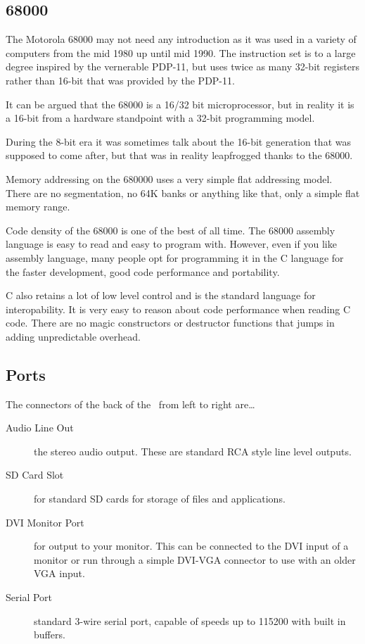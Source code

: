 \begin{leftbar}
\subsection*{68000}

The Motorola 68000 may not need any introduction as it was used in a
variety of computers from the mid 1980 up until mid 1990. The
instruction set is to a large degree inspired by the vernerable
PDP-11, but uses twice as many 32-bit registers rather than 16-bit that
was provided by the PDP-11.

It can be argued that the 68000 is a 16/32 bit microprocessor, but in
reality it is a 16-bit from a hardware standpoint with a 32-bit
programming model.

During the 8-bit era it was sometimes talk about the 16-bit generation that
was supposed to come after, but that was in reality leapfrogged thanks
to the 68000.

Memory addressing on the 680000 uses a very simple flat addressing
model. There are no segmentation, no 64K banks or anything like that,
only a simple flat memory range.

Code density of the 68000 is one of the best of all time. The 68000
assembly language is easy to read and easy to program with.
However, even if you like assembly language, many people opt for
programming it in the C language for the faster development, good code
performance and portability.

C also retains a lot of low level control and is the standard language
for interopability. It is very easy to reason about code performance
when reading C code. There are no magic constructors or destructor
functions that jumps in adding unpredictable overhead.
\end{leftbar}

\subsection*{Ports}

The connectors of the back of the \foenix\ from left to right are\dots

\begin{description}
    \item[Audio Line Out] the stereo audio output. These are standard RCA style line level outputs.

    \item[SD Card Slot] for standard SD cards for storage of files and applications.

    \item[DVI Monitor Port] for output to your monitor. This can be connected to the DVI input of a monitor or run through a simple DVI-VGA connector to use with an older VGA input.

    \item[Serial Port] standard 3-wire serial port, capable of speeds
      up to 115200 with built in buffers.
\end{description}

